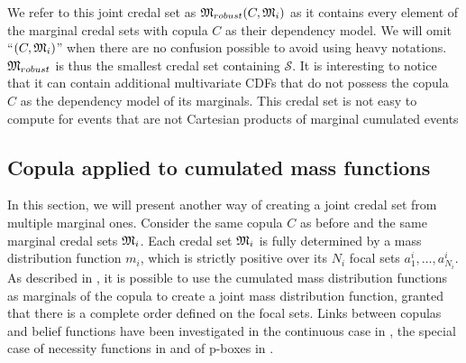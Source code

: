 We refer to this joint credal set as ${\mathfrak{M}}_{robust}(C,{\mathfrak{M}}_i)$ as it contains every element of the marginal credal sets with copula $C$ as their dependency model. We will omit ``$(C,{\mathfrak{M}}_i)$'' when there are no confusion possible to avoid using heavy notations. ${\mathfrak{M}}_{robust}$ is thus the smallest credal set containing $\mathcal{S}$. It is interesting to notice that it can contain additional multivariate CDFs that do not possess the copula $C$ as the dependency model of its marginals. This credal set is not easy to compute for events that are not Cartesian products of marginal cumulated events

\subsection{Copula applied to cumulated mass functions}\label{sec:joint_mass}
In this section, we will present another way of creating a joint credal set from multiple marginal ones. Consider the same copula $C$ as before and the same marginal credal sets ${\mathfrak{M}}_i$. Each credal set ${\mathfrak{M}}_i$ is fully determined by a mass distribution function $m_i$, which is strictly positive over its $N_i$ focal sets $a^i_1, \dots, a^i_{N_i}$. As described in \cite{ferson_dependence_2004}, it is possible to use the cumulated mass distribution functions as marginals of the copula to create a joint mass distribution function, granted that there is a complete order defined on the focal sets. Links between copulas and belief functions have been investigated in the continuous case in \cite{schmelzer_joint_2015, schmelzer_multivariate_2019}, the special case of necessity functions in \cite{schmelzer_sklars_2015} and of p-boxes in \cite{schmelzer_random_2023}.

